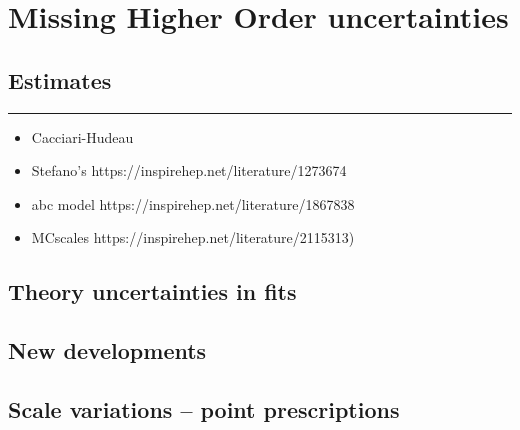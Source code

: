 
\chapter{Missing Higher Order uncertainties}
\label{ch:mhou}
\minitoc
\adjustmtc



\section{Estimates}
\label{sec:mhou/estimates}


\vspace*{20pt}
\noindent
\rule{\hsize}{1pt}

\begin{itemize}
	\item Cacciari-Hudeau
	\item  Stefano's https://inspirehep.net/literature/1273674
	\item abc model https://inspirehep.net/literature/1867838
	\item MCscales https://inspirehep.net/literature/2115313)
\end{itemize} 

\section{Theory uncertainties in \pdf fits}
\label{sec:mhou/pdf}


\section{New developments}
\label{sec:mhou/new}


\section{Scale variations -- point prescriptions}
\label{sec:mhou/prescriptions}

